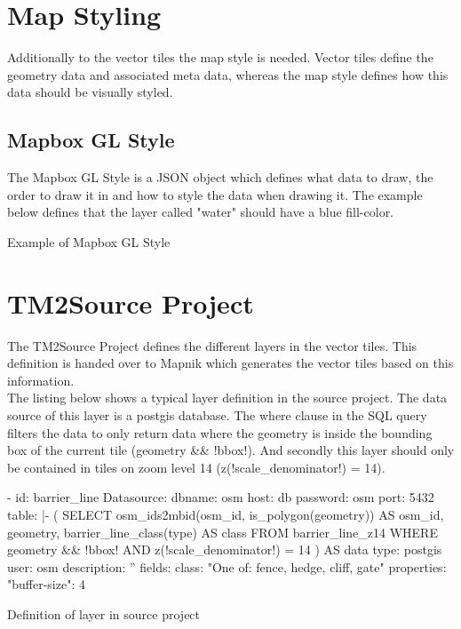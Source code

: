 \section{Map Styling}\label{part1_map_styling}

Additionally to the vector tiles the map style is needed. Vector tiles define the geometry data and associated meta data, whereas the map style defines how this data should be visually styled.
\clearpage

\subsection{Mapbox GL Style}

The Mapbox GL Style is a JSON object which defines what data to draw, the order to draw it in and how to style the data when drawing it\cite{105_mapbox.com_2016}. The example below defines that the layer called "water" should have a blue fill-color.

\begin{listing}[H]
\caption{Example of Mapbox GL Style}
\label{example_of_mapbox_gl_style}
\end{listing}

\section{TM2Source Project}\label{par1_tm2source_project}

The TM2Source Project defines the different layers in the vector tiles. This definition is handed over to Mapnik which generates the vector tiles based on this information.\\
The listing below shows a typical layer definition in the source project. The data source of this layer is a postgis database. The where clause in the SQL query filters the data to only return data where the geometry is inside the bounding box of the current tile (geometry && !bbox!). And secondly this layer should only be contained in tiles on zoom level 14 (z(!scale\_denominator!) = 14).

\begin{listing}[H]
\begin{yamlcode}
- id: barrier_line
    Datasource: 
      dbname: osm
      host: db
      password: osm
      port: 5432
      table: |-
        (
          SELECT osm_ids2mbid(osm_id, is_polygon(geometry)) AS osm_id, geometry,
          barrier_line_class(type) AS class
          FROM barrier_line_z14
          WHERE geometry && !bbox!
            AND z(!scale_denominator!) = 14
        ) AS data
      type: postgis
      user: osm
    description: ''
    fields: 
      class: "One of: fence, hedge, cliff, gate"
    properties: 
      "buffer-size": 4
\end{yamlcode}
\caption{Definition of layer in source project}
\label{definition_of_layer_in_source_project}
\end{listing}

